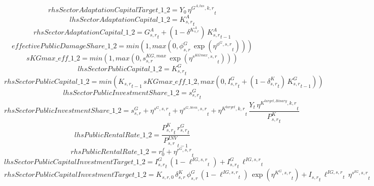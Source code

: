 \begin{dmath*}
rhsSectorAdaptationCapitalTarget\_1\_2 = {{Y_0}}\, {{\eta^{G^{A,tas},k,r}}}_{t}
\end{dmath*}
\begin{dmath*}
lhsSectorAdaptationCapital\_1\_2 = {{K^{A}_{s,r}}}_{t}
\end{dmath*}
\begin{dmath*}
rhsSectorAdaptationCapital\_1\_2 = {{G^{A}_{s,r}}}_{t}+\left(1-{{\delta^{K^{A}_{s,r}}}}\right)\, {{K^{A}_{s,r}}}_{t-1}
\end{dmath*}
\begin{dmath*}
effectivePublicDamageShare\_1\_2 = min(1,max(0,{{\phi^{G}_{s,r}}}\, \exp\left({{\eta^{\phi^{G},s,r}}}_{t}\right)))
\end{dmath*}
\begin{dmath*}
sKGmax\_eff\_1\_2 = min(1,max(0,{{s^{KG,max}_{s,r}}}\, \exp\left({{\eta^{s^{KGmax},s,r}}}_{t}\right)))
\end{dmath*}
\begin{dmath*}
lhsSectorPublicCapital\_1\_2 = {{K^G_{s,r}}}_{t}
\end{dmath*}
\begin{dmath*}
rhsSectorPublicCapital\_1\_2 = min({{K_{s,r}}}_{t-1}\, {sKGmax\_eff\_1\_2},max(0,{{I^G_{s,r}}}_{t}+\left(1-{{\delta^{K}_{s,r}}}_{t}\right)\, {{K^G_{s,r}}}_{t-1}))
\end{dmath*}
\begin{dmath*}
lhsSectorPublicInvestmentShare\_1\_2 = {{s^G_{s,r}}}_{t}
\end{dmath*}
\begin{dmath*}
rhsSectorPublicInvestmentShare\_1\_2 = {{s^{G}_{s,r}}}+{{\eta^{s^G,s,r}}}_{t}+{{\eta^{s^{G,Scen},s,r}}}_{t}+{{\eta^{K^{target},k,r}}}_{t}\, \frac{{Y}_{t}\, {{\eta^{K^{target,Binary},k,r}}}_{t}}{{{P^K_{s,r}}}_{t}}
\end{dmath*}
\begin{dmath*}
lhsPublicRentalRate\_1\_2 = \frac{{{P^K_{s,r}}}_{t}\, {{r^G_{s,r}}}_{t}}{{{P^{INV}_{s,r}}}_{t-1}}
\end{dmath*}
\begin{dmath*}
rhsPublicRentalRate\_1\_2 = {{r^f_0}}+{{\eta^{r^G,s,r}}}_{t}
\end{dmath*}
\begin{dmath*}
lhsSectorPublicCapitalInvestmentTarget\_1\_2 = {{I^G_{s,r}}}_{t}\, \left(1-{{\ell^{IG,s,r}}}_{t}\right)+{{I^G_{s,r}}}_{t}\, {{\ell^{IG,s,r}}}_{t}
\end{dmath*}
\begin{dmath*}
rhsSectorPublicCapitalInvestmentTarget\_1\_2 = {{K_{s,r,0}}}\, {{\delta^{K}_{s,r}}}\, {{\phi^{G}_{s,r}}}\, \left(1-{{\ell^{IG,s,r}}}_{t}\right)\, \exp\left({{\eta^{K^G,s,r}}}_{t}\right)+{{I_{s,r}}}_{t}\, {{\ell^{IG,s,r}}}_{t}\, {{\eta^{s^{IG},s,r}}}_{t}
\end{dmath*}
